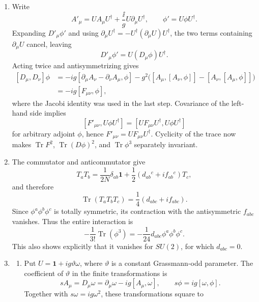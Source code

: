 \begin{enumerate}
  \begin{enumerate}
    \item[(a)]
    Write
    \[
      A'_\mu=UA_\mu U^\dagger+\frac{\ii}{g}U\partial_\mu U^\dagger,
      \qquad \phi'=U\phi U^\dagger.
    \]
    Expanding \(D'_\mu\phi'\) and using
    \(\partial_\mu U^\dagger=-U^\dagger(\partial_\mu U)U^\dagger\), the
    two terms containing \(\partial_\mu U\) cancel, leaving
    \[
      \boxed{D'_\mu\phi'=U(D_\mu\phi)U^\dagger.}
    \]
    Acting twice and antisymmetrizing gives
    \[
    \begin{split}
      [D_\mu,D_\nu]\phi
       &=-ig[\partial_\mu A_\nu-\partial_\nu A_\mu,\phi]
         -g^2\bigl([A_\mu,[A_\nu,\phi]]
                  -[A_\nu,[A_\mu,\phi]]\bigr)\\
       &=-ig[F_{\mu\nu},\phi],
    \end{split}
    \]
    where the Jacobi identity was used in the last step.  Covariance of the
    left-hand side implies
    \[
      [F'_{\mu\nu},U\phi U^\dagger]
        =[UF_{\mu\nu}U^\dagger,U\phi U^\dagger]
    \]
    for arbitrary adjoint \(\phi\), hence
    \(F'_{\mu\nu}=UF_{\mu\nu}U^\dagger\).  Cyclicity of the trace now makes
    \(\operatorname{Tr}F^2\), \(\operatorname{Tr}(D\phi)^2\), and
    \(\operatorname{Tr}\phi^3\) separately invariant.
    \item[(b)]
    The commutator and anticommutator give
    \[
      T_aT_b=\frac1{2N}\delta_{ab}\mathbf1
        +\frac12(d_{ab}{}^c+if_{ab}{}^c)T_c,
    \]
    and therefore
    \[
      \operatorname{Tr}(T_aT_bT_c)
        =\frac14(d_{abc}+if_{abc}).
    \]
    Since \(\phi^a\phi^b\phi^c\) is totally symmetric, its contraction with
    the antisymmetric \(f_{abc}\) vanishes.  Thus the entire interaction is
    \[
      \boxed{-\frac1{3!}\operatorname{Tr}(\phi^3)
        =-\frac1{24}d_{abc}\phi^a\phi^b\phi^c.}
    \]
    This also shows explicitly that it vanishes for \(SU(2)\), for which
    \(d_{abc}=0\).
    \item[(c)]
    \begin{enumerate}
      \item[(i)] Put \(U=\mathbf{1}+ig\vartheta\omega\), where \(\vartheta\) is a
      constant Grassmann-odd parameter.  The coefficient of \(\vartheta\)
      in the finite transformations is
      \[
        \boxed{sA_\mu=D_\mu\omega
          =\partial_\mu\omega-ig[A_\mu,\omega],\qquad
        s\phi=ig[\omega,\phi].}
      \]
      Together with \(s\omega=ig\omega^2\), these transformations square to

\end{enumerate}
\end{enumerate}
\end{enumerate}
